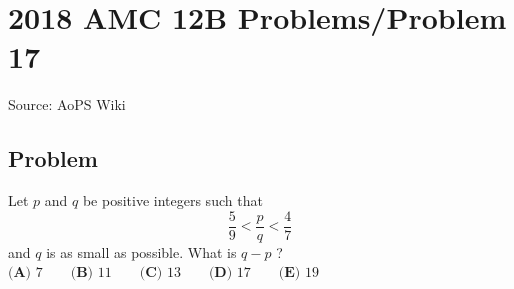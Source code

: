 \documentclass[12pt]{article}
\begin{document}
\section*{{2018 AMC 12B Problems/Problem 17}}
Source: AoPS Wiki

\subsection*{Problem}
Let $p$ and $q$ be positive integers such that \[\frac{5}{9} < \frac{p}{q} < \frac{4}{7}\] and $q$ is as small as possible. What is $q-p$ ? $\textbf{(A) } 7 \qquad \textbf{(B) } 11 \qquad \textbf{(C) } 13 \qquad \textbf{(D) } 17 \qquad \textbf{(E) } 19$
\end{document}
